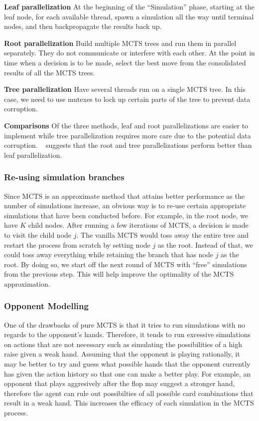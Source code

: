 \documentclass[11pt, a4paper, oneside]{article}
\begin{document}
\textbf{Leaf parallelization}
At the beginning of the ``Simulation'' phase, starting at the leaf node, for each available thread, spawn a simulation all the way until terminal nodes, and then backpropagate the results back up.

\textbf{Root parallelization}
Build multiple MCTS trees and run them in parallel separately. They do not communicate or interfere with each other. At the point in time when a decision is to be made, select the best move from the consolidated results of all the MCTS trees.

\textbf{Tree parallelization}
Have several threads run on a single MCTS tree. In this case, we need to use mutexes to lock up certain parts of the tree to prevent data corruption.

\textbf{Comparisons}
Of the three methods, leaf and root parallelizations are easier to implement while tree parallelization requires more care due to the potential data corruption. ~\cite{Chaslot} suggests that the root and tree parallelizations perform better than leaf parallelization.

\subsubsection{Re-using simulation branches}
Since MCTS is an approximate method that attains better performance as the number of simulations increase, an obvious way is to re-use certain appropriate simulations that have been conducted before. For example, in the root node, we have $K$ child nodes. After running a few iterations of MCTS, a decision is made to visit the child node $j$. The vanilla MCTS would toss away the entire tree and restart the process from scratch by setting node $j$ as the root. Instead of that, we could toss away everything while retaining the branch that has node $j$ as the root. By doing so, we start off the next round of MCTS with ``free'' simulations from the previous step. This will help improve the optimality of the MCTS approximation.

\subsubsection{Opponent Modelling}
One of the drawbacks of pure MCTS is that it tries to run simulations with no regards to the opponent's hands. Therefore, it tends to run excessive simulations on actions that are not necessary such as simulating the possibilities of a high raise given a weak hand. Assuming that the opponent is playing rationally, it may be better to try and guess what possible hands that the opponent currently has given the action history so that one can make a better play. For example, an opponent that plays aggresively after the flop may suggest a stronger hand, therefore the agent can rule out possibilties of all possible card combinations that result in a weak hand. This increases the efficacy of each simulation in the MCTS process.
\end{document}
